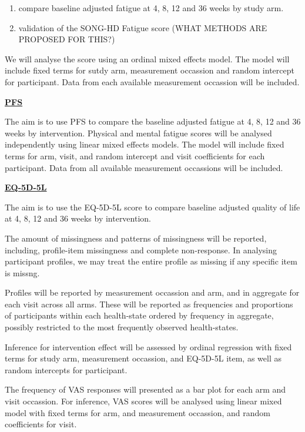 \documentclass[11pt,parskip=half-]{scrartcl}
\providecommand{\tightlist}{%
  \setlength{\itemsep}{0pt}\setlength{\parskip}{0pt}}
\begin{document}
\begin{enumerate}
  \tightlist
  \item compare baseline adjusted fatigue at 4, 8, 12 and 36 weeks by study arm.
  \item validation of the SONG-HD Fatigue score (WHAT METHODS ARE PROPOSED FOR THIS?)
\end{enumerate}

We will analyse the score using an ordinal mixed effects model. The model will include fixed terms for sutdy arm, measurement occassion and random intercept for participant. Data from each available measurement occassion will be included.

\label{analysis:pfs}
\hyperref[outcome:pfs]{\textbf{PFS}}

The aim is to use PFS to compare the baseline adjusted fatigue at 4, 8, 12 and 36 weeks by intervention. Physical and mental fatigue scores will be analysed independently using linear mixed effects models. The model will include fixed terms for arm, visit, and random intercept and visit coefficients for each participant. Data from all available measurement occassions will be included.


\label{analysis:eq5d5l}
\hyperref[outcome:eq5d5l]{\textbf{EQ-5D-5L}}

The aim is to use the EQ-5D-5L score to compare baseline adjusted quality of life at 4, 8, 12 and 36 weeks by intervention.

The amount of missingness and patterns of missingness will be reported, including, profile-item missingness and complete non-response. In analysing participant profiles, we may treat the entire profile as missing if any specific item is missng.

Profiles will be reported by measurement occassion and arm, and in aggregate for each visit across all arms. These will be reported as frequencies and proportions of participants within each health-state ordered by frequency in aggregate, possibly restricted to the most frequently observed health-states.

Inference for intervention effect will be assessed by ordinal regression with fixed terms for study arm, measurement occassion, and EQ-5D-5L item, as well as random intercepts for participant.

The frequency of VAS responses will presented as a bar plot for each arm and visit occassion. For inference, VAS scores will be analysed using linear mixed model with fixed terms for arm, and measurement occassion, and random coefficients for visit.
\end{document}
